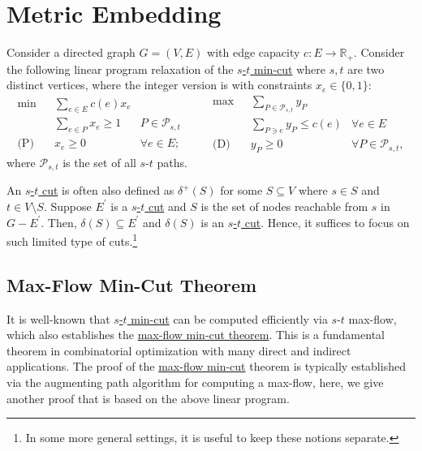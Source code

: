 \section{Metric Embedding}
Consider a directed graph \(G= (V, E)\) with edge capacity \(c \colon E \to \mathbb{R} _+\). Consider the following linear program relaxation of the \hyperref[prb:s-t-min-cut]{\(s\)-\(t\) min-cut} where \(s, t\) are two distinct vertices, where the integer version is with constraints \(x_e \in \{ 0, 1 \} \):
\begin{equation}\label{eq:s-t-min-cut-LP}
	\begin{aligned}
		\min~           & \sum_{e \in E} c(e) x_e                              \\
		                & \sum_{e \in P} x_e \geq 1 & P \in \mathcal{P}_{s, t} \\
		\text{(P)}\quad & x_e \geq 0                & \forall e \in E;
	\end{aligned}\qquad
	\begin{aligned}
		\max~           & \sum_{P \in \mathcal{P}_{s, t}} y_P                                     \\
		                & \sum_{P \ni e} y_P \leq c(e)        & \forall e \in E                   \\
		\text{(D)}\quad & y_P \geq 0                          & \forall P \in \mathcal{P}_{s, t},
	\end{aligned}
\end{equation}
where \(\mathcal{P} _{s, t}\) is the set of all \(s\)-\(t\) paths.

\begin{remark}
	An \hyperref[prb:s-t-min-cut]{\(s\)-\(t\) cut} is often also defined as \(\delta ^+(S)\) for some \(S \subseteq V\) where \(s \in S\) and \(t \in V \setminus S\). Suppose \(E^{\prime} \) is a \hyperref[prb:s-t-min-cut]{\(s\)-\(t\) cut} and \(S\) is the set of nodes reachable from \(s\) in \(G - E^{\prime} \). Then, \(\delta (S) \subseteq E^{\prime} \) and \(\delta (S)\) is an \hyperref[prb:s-t-min-cut]{\(s\)-\(t\) cut}. Hence, it suffices to focus on such limited type of cuts.\footnote{In some more general settings, it is useful to keep these notions separate.}
\end{remark}

\subsection{Max-Flow Min-Cut Theorem}
It is well-known that \hyperref[prb:s-t-min-cut]{\(s\)-\(t\) min-cut} can be computed efficiently via \(s\)-\(t\) max-flow, which also establishes the \hyperref[thm:max-flow-min-cut]{max-flow min-cut theorem}. This is a fundamental theorem in combinatorial optimization with many direct and indirect applications. The proof of the \hyperref[thm:max-flow-min-cut]{max-flow min-cut} theorem is typically established via the augmenting path algorithm for computing a max-flow, here, we give another proof that is based on the above linear program.

